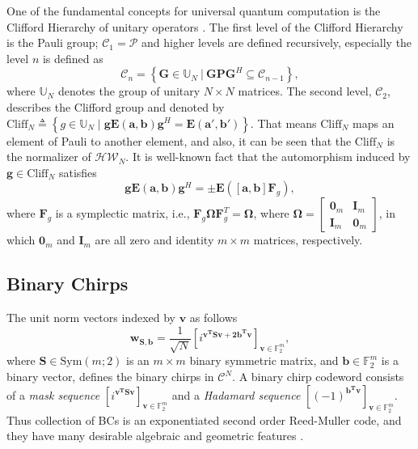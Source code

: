 \documentclass[lettersize,journal,onecolumn]{IEEEtran}
\begin{document}
One of the fundamental concepts for universal quantum computation is the Clifford Hierarchy of unitary operators \cite{GottesmanTelport99, Rengaswamy2019UnifyingTC}. The first level of the Clifford Hierarchy is the Pauli group; $\mathcal{C}_1 = \mathcal{P}$ and higher levels are defined recursively, especially the level $n$ is defined as 
\begin{equation}
	\mathcal{C}_n = \left\{ \mathbf{G} \in \mathbb{U}_N \: \bigg| \: \mathbf{G} \mathbf{P} \mathbf{G}^H \subseteq \mathcal{C}_{n-1}  \right\},
\end{equation}
where $\mathbb{U}_N$ denotes the group of unitary $N\times N$ matrices. The second level, $\mathcal{C}_2$, describes the Clifford group and denoted by $\text{Cliff}_N \triangleq \left\{ g\in \mathbb{U}_N \; | \; \mathbf{g}\mathbf{E}\left(\mathbf{a,b}\right) \mathbf{g}^H = \mathbf{E}\left(\mathbf{a',b'}\right) \right\}$. That means $\text{Cliff}_N$ maps an element of Pauli to another element, and also, it can be seen that the $\text{Cliff}_N$ is the normalizer of $\mathcal{HW}_N$. It is well-known fact that the automorphism induced by $\mathbf{g}\in \text{Cliff}_N$ satisfies 
\begin{equation}
	\mathbf{g E}\left(\mathbf{a,b}\right)\mathbf{g}^H = \pm \mathbf{E}\left(\left[\mathbf{a, b}\right] \mathbf{F}_g \right),
\end{equation} 
where $\mathbf{F}_g$ is a symplectic matrix, i.e., $\mathbf{F}_g \mathbf{\Omega} \mathbf{F}_g^T = \mathbf{\Omega}$, where $\mathbf{\Omega} = \begin{bmatrix}
	\mathbf{0}_m & \mathbf{I}_m \\
	\mathbf{I}_m & \mathbf{0}_m
\end{bmatrix}$, in which $\mathbf{0}_m$ and $\mathbf{I}_m$ are all zero and identity $m \times m$ matrices, respectively.
\subsection{Binary Chirps}
The unit norm vectors indexed by $\mathbf{v}$ as follows
\begin{equation}\label{BCmainDef}
	\mathbf{w}_{\mathbf{S,b}} = \dfrac{1}{\sqrt{N}}\left[i^{\mathbf{v^TSv + 2b^Tv}}\right]_{\mathbf{v} \in \mathbb{F}_2^m},
\end{equation}
where $\mathbf{S}\in \text{Sym}(m;2)$ is an $m\times m $ binary symmetric matrix, and $\mathbf{b}\in \mathbb{F}_2^m$ is a binary vector, defines the  binary chirps in $\mathcal{C}^N$. A binary chirp codeword consists of a \textit{mask sequence} $\left[i^{\mathbf{v^TSv}}\right]_{\mathbf{v} \in \mathbb{F}_2^m}$ and a \textit{Hadamard sequence} $\left[(-1)^{\mathbf{b^Tv}}\right]_{\mathbf{v} \in \mathbb{F}_2^m}$. Thus collection of BCs is an exponentiated second order Reed-Muller code, and they have many desirable algebraic and geometric features \cite{Pllaha22LCGbc, Olav19CodeComplex}.
 
\end{document}
